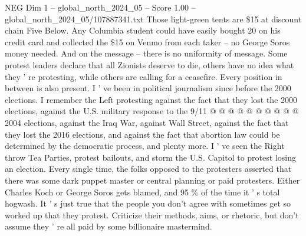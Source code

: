 \begin{textsample}{NEG Dim 1 – global\_north\_2024\_05 – Score 1.00 – global\_north\_2024\_05/107887341.txt}
Those light-green tents are \$15 at discount chain Five Below.
Any Columbia student could have easily bought 20 on his credit card and collected the \$15 on Venmo from each taker -- no George Soros money needed.
And on the message -- there is no uniformity of message.
Some protest leaders declare that all Zionists deserve to die, others have no idea what they ' re protesting, while others are calling for a ceasefire.
Every position in between is also present.
I ' ve been in political journalism since before the 2000 elections.
I remember the Left protesting against the fact that they lost the 2000 elections, against the U.S. military response to the 9/11 @ @ @ @ @ @ @ @ @ @ 2004 elections, against the Iraq War, against Wall Street, against the fact that they lost the 2016 elections, and against the fact that abortion law could be determined by the democratic process, and plenty more.
I ' ve seen the Right throw Tea Parties, protest bailouts, and storm the U.S.
Capitol to protest losing an election.
Every single time, the folks opposed to the protesters asserted that there was some dark puppet master or central planning or paid protesters.
Either Charles Koch or George Soros gets blamed, and 95 \% of the time it ' s total hogwash.
It ' s just true that the people you don't agree with sometimes get so worked up that they protest.
Criticize their methods, aims, or rhetoric, but don't assume they ' re all paid by some billionaire mastermind.

\end{textsample}
